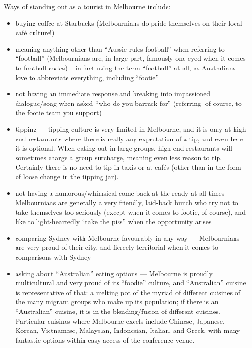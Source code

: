 Ways of standing out as a tourist in Melbourne include:
\begin{itemize}
\item buying coffee at Starbucks (Melbournians do pride themselves on
  their local caf\'e culture!)
\item meaning anything other than ``Aussie rules football'' when
  referring to ``football'' (Melbournians are, in large part, famously
  one-eyed when it comes to football codes)... in fact using the term
  ``football'' at all, as Australians love to abbreviate everything,
  including ``footie''
\item not having an immediate response and breaking into impassioned
  dialogue/song when asked ``who do you barrack for'' (referring, of
  course, to the footie team you support)
\item tipping --- tipping culture is very limited in Melbourne, and it
  is only at high-end restaurants where there is really any expectation
  of a tip, and even here it is optional. When eating out in large
  groups, high-end restaurants will sometimes charge a group surcharge,
  meaning even less reason to tip. Certainly there is no need to tip in
  taxis or at caf\'es (other than in the form of loose change in the
  tipping jar).
\item not having a humorous/whimsical come-back at the ready at all
  times --- Melbournians are generally a very friendly, laid-back bunch
  who try not to take themselves too seriously (except when it comes to
  footie, of course), and like to light-heartedly ``take the piss'' when
  the opportunity arises
\item comparing Sydney with Melbourne favourably in any way ---
  Melbournians are very proud of their city, and fiercely territorial
  when it comes to comparisons with Sydney
\item asking about ``Australian'' eating options --- Melbourne is
  proudly multicultural and very proud of its ``foodie'' culture, and
  ``Australian'' cuisine is representative of that: a melting pot of the
  myriad of different cuisines of the many migrant groups who make up
  its population; if there is an ``Australian'' cuisine, it is in the
  blending/fusion of different cuisines. Particular cuisines where
  Melbourne excels include Chinese, Japanese, Korean, Vietnamese,
  Malaysian, Indonesian, Italian, and Greek, with many fantastic options
  within easy access of the conference venue.
\end{itemize}


